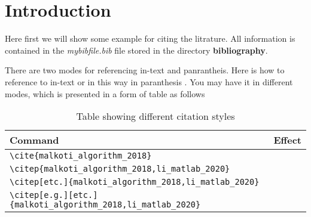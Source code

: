 \chapter{Introduction}

Here first we will show some example for citing the litrature. 
All information is contained in the \textit{mybibfile.bib} file stored in the 
directory \textbf{bibliography}. 


There are two modes for referencing in-text and panrantheis. 
Here is how to reference to in-text  \cite{malkoti_algorithm_2018} or in this way 
in paranthesis \citep{li_matlab_2020}.   
%
You may have it in different modes, which is presented in a form of table as follows


\begin{table}
\caption{Table showing different citation styles}
\label{tab:citation_style}
\begin{tabular}{ll}	
	\hline
	Command  & Effect \\
	\hline
	\verb|\cite{malkoti_algorithm_2018}|   &\cite{malkoti_algorithm_2018}\\
	\verb|\citep{malkoti_algorithm_2018,li_matlab_2020}|   &\citep{malkoti_algorithm_2018,li_matlab_2020}\\
	\verb|\citep[etc.]{malkoti_algorithm_2018,li_matlab_2020}|   &\citep[etc.]{malkoti_algorithm_2018,li_matlab_2020}\\
	\verb|\citep[e.g.][etc.]{malkoti_algorithm_2018,li_matlab_2020}|   &\citep[e.g.][etc.]{malkoti_algorithm_2018,li_matlab_2020} \\
	\hline	
\end{tabular}

\end{table}


